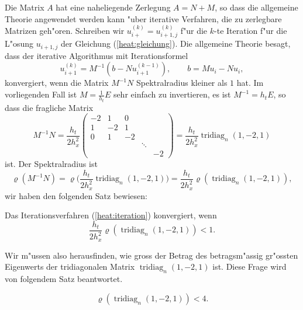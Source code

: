Die Matrix $A$ hat eine naheliegende Zerlegung $A=N+M$, so dass
die allgemeine Theorie angewendet werden kann "uber iterative Verfahren,
die zu zerlegbare Matrizen geh"oren.
Schreiben wir $u^{(k)}_{i+}=u^{(k)}_{i+1,j}$ f"ur die $k$-te Iteration f"ur die
L"osung $u_{i+1,j}$ der Gleichung (\ref{heat:gleichung}).
Die allgemeine Theorie besagt, dass der iterative Algorithmus mit
Iterationsformel
\begin{equation}
u^{(k)}_{i+1}=M^{-1}(b-Nu_{i+1}^{(k-1)}),\qquad b=Mu_{i}-Nu_{i},
\label{heat:iteration}
\end{equation}
konvergiert, wenn die Matrix $M^{-1}N$ Spektralradius kleiner als $1$ hat.
Im vorliegenden Fall ist $M=\frac1{h_t}E$ sehr einfach zu invertieren,
es ist $M^{-1}=h_tE$, so dass die fragliche Matrix 
\[
M^{-1}N=\frac{h_t}{2h_x^2}
\begin{pmatrix}
-2& 1& 0&      &  \\
 1&-2& 1&      &  \\
 0& 1&-2&      &  \\
  &  &  &\ddots&  \\
  &  &  &      &-2
\end{pmatrix}
=\frac{h_t}{2h_x^2}\operatorname{tridiag}_n(1,-2,1)
\]
ist.
Der Spektralradius ist
\[
\varrho(M^{-1}N)
=
\varrho\biggl(\frac{h_t}{2h_x^2}\operatorname{tridiag}_n(1,-2,1)\biggr)
=
\frac{h_t}{2h_x^2}\varrho(\operatorname{tridiag}_n(1,-2,1)),
\]
wir haben den folgenden Satz bewiesen:

\begin{satz}
Das Iterationsverfahren (\ref{heat:iteration}) konvergiert, wenn 
\[
\frac{h_t}{2h_x^2}\varrho(\operatorname{tridiag}_n(1,-2,1))<1.
\]
\end{satz}

Wir m"ussen also herausfinden, wie gross der Betrag des
betragsm"assig gr"ossten Eigenwerts
der tridiagonalen Matrix $\operatorname{tridiag}_n(1,-2,1)$ ist.
Diese Frage wird von folgendem Satz beantwortet.

\begin{satz}
\[
\varrho(\operatorname{tridiag}_n(1,-2,1))<4.
\]
\end{satz}

